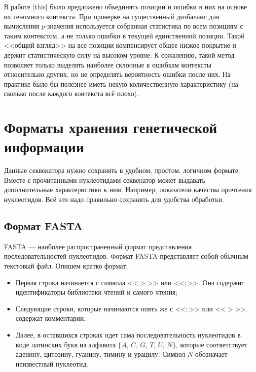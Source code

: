 	В работе [this] было предложено объединять позиции и ошибки в них на основе их геномного контекста. При проверке на существенный дизбаланс для вычисления $p$-значения используется собранная статистика по всем позициям с таким контекстом, а не только ошибки в текущей единственной позиции. Такой <<общий взгляд>> на все позиции компенсирует общее низкое покрытие и держит статистическую силу на высоком уровне. К сожалению, такой метод позволяет только выделять наиболее склонные к ошибкам контексты относительно других, но не определять вероятность ошибки после них. 
На практике было бы полезнее иметь некую количественную характеристику (на сколько после каждого контекста всё плохо).

\section{Форматы хранения генетической информации}

Данные секвенатора нужно сохранять в удобном, простом, логичном формате. Вместе с прочитанными нуклеотидами секвенатор может выдавать дополнительные характеристики к ним. Например,  показатели качества прочтения нуклеотидов. Всё это надо правильно сохранять для удобства обработки.

\subsection{Формат FASTA}
FASTA — наиболее распространенный формат представления последовательностей нуклеотидов.
Формат FASTA представляет собой обычным текстовый файл. Опишем кратко формат:
\begin{itemize}
\item Первая строка начинается с символа <<$>$>> или <<$;$>>. Она содержит идентификаторы библиотеки чтений и самого чтения;
\item Следующие строки, которые начинаются опять же с <<$;$>> или <<$>$>>, содержат комментарии. 
\item Далее, в оставшихся строках идет сама последовательность нуклеотидов в виде латинских букв из алфавита \{$A$, $C$, $G$, $T$, $U$, $N$\}, которые соответствует аденину, цитозину, гуанину, тимину и урацилу.  Символ $N$ обозначает неизвестный нуклеотид.
\end{itemize}

